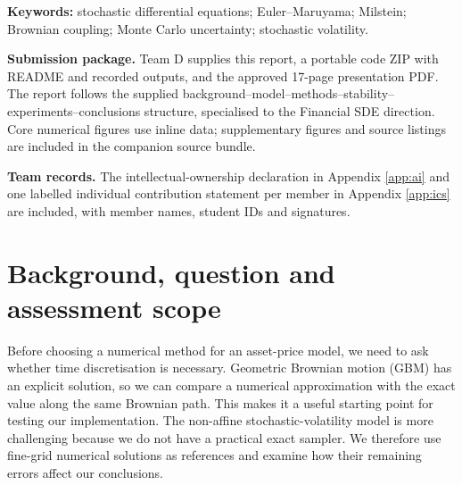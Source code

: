 \maketitle
\begin{abstract}
An exact stochastic benchmark is useful for validating an algorithm but can conceal whether discretisation is necessary. We first compare exact geometric Brownian motion (GBM), price-space Euler--Maruyama (EM), and scalar Milstein on common Brownian paths. With 65,536 independent paths, measured terminal mean-absolute-error orders are 0.4975 and 0.9972. An exact formula for the discrete expectation separates weak time-step bias from Monte Carlo uncertainty. We then simulate the prescribed non-affine stochastic-volatility model using log-price EM and nested reference grids. Its empirical strong rate is 0.5003 relative to the finest reference, while most estimated call-payoff biases are statistically unresolved. A model-specific extension matches the factor's exact mean dynamics and stationary variance and removes EM's second-moment step-size restriction. A coarse-step stress test exposes both EM moment instability and a misleading Monte Carlo confidence interval caused by rare large values. At a common GBM error ceiling, Milstein uses sixteen times fewer path updates than EM; exact terminal simulation remains preferable for GBM. All numerical claims are tied to executable source, recorded outputs and explicit limitations.
\end{abstract}
\textbf{Keywords:} stochastic differential equations; Euler--Maruyama; Milstein; Brownian coupling; Monte Carlo uncertainty; stochastic volatility.

\textbf{Submission package.} Team D supplies this report, a portable code ZIP with README and recorded outputs, and the approved 17-page presentation PDF. The report follows the supplied background--model--methods--stability--experiments--conclusions structure, specialised to the Financial SDE direction. Core numerical figures use inline data; supplementary figures and source listings are included in the companion source bundle.

\textbf{Team records.} The intellectual-ownership declaration in Appendix \ref{app:ai} and one labelled individual contribution statement per member in Appendix \ref{app:ics} are included, with member names, student IDs and signatures.
\clearpage
{\small\setlength{\parskip}{0pt}\tableofcontents}
\clearpage

\section{Background, question and assessment scope}
\label{sec:background}
Before choosing a numerical method for an asset-price model, we need to ask whether time discretisation is necessary. Geometric Brownian motion (GBM) has an explicit solution, so we can compare a numerical approximation with the exact value along the same Brownian path. This makes it a useful starting point for testing our implementation. The non-affine stochastic-volatility model is more challenging because we do not have a practical exact sampler. We therefore use fine-grid numerical solutions as references and examine how their remaining errors affect our conclusions.

